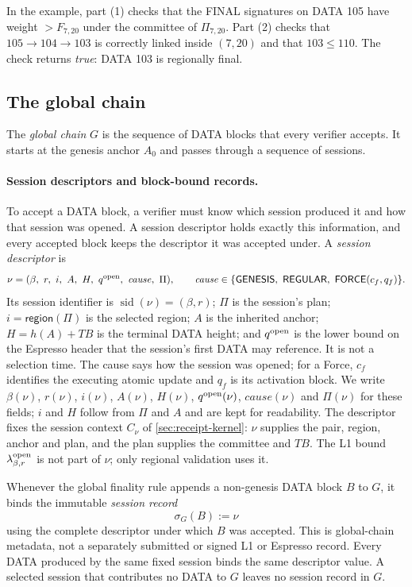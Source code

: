 \documentclass[11pt,a4paper]{article}
\newcommand{\TB}{\mathit{TB}}
\newcommand{\tagg}[1]{\ensuremath{\mathsf{#1}}}
\newcommand{\defterm}[1]{\textcolor{rrBlue}{\textit{#1}}}
\begin{document}
In the example, part (1) checks that the FINAL signatures on DATA 105
have weight $>F_{7,20}$ under the committee of $\Pi_{7,20}$. Part (2) checks that
$105\to104\to103$ is correctly linked inside $(7,20)$ and that
$103\le110$. The check returns \emph{true}: DATA 103 is regionally final.



\subsection{The global chain}
\label{sec:global-finality}
\label{sec:global-chain}
The \defterm{global chain} $G$ is the sequence of DATA blocks that every
verifier accepts. It starts at the genesis anchor $A_0$ and passes
through a sequence of sessions.

\paragraph{Session descriptors and block-bound records.}
To accept a DATA block, a verifier must know which session produced it
and how that session was opened. A session descriptor holds exactly this
information, and every accepted block keeps the descriptor it was
accepted under. A \defterm{session descriptor} is
\[
 \nu=(\beta,\ r,\ i,\ A,\ H,\ q^{\rm open},\ \mathit{cause},\ \Pi),\qquad
 \mathit{cause}\in\{\tagg{GENESIS},\ \tagg{REGULAR},\
 \tagg{FORCE}(c_f,q_f)\}.
\]
Its session identifier is $\operatorname{sid}(\nu)=(\beta,r)$; $\Pi$ is
the session's plan; $i=\tagg{region}(\Pi)$ is the selected region; $A$ is
the inherited anchor; $H=h(A)+\TB$ is the terminal DATA height; and
$q^{\rm open}$ is the lower bound on the Espresso header that the
session's first DATA may reference. It is not a selection time. The
cause says how the session was opened; for a Force, $c_f$ identifies the
executing atomic update and $q_f$ is its activation block.  We write
$\beta(\nu)$, $r(\nu)$, $i(\nu)$, $A(\nu)$, $H(\nu)$, $q^{\rm open}(\nu)$,
$\mathit{cause}(\nu)$ and $\Pi(\nu)$ for these fields; $i$ and $H$ follow
from $\Pi$ and $A$ and are kept for readability.  The descriptor
fixes the session context $C_\nu$ of \cref{sec:receipt-kernel}: $\nu$
supplies the pair, region, anchor and plan, and the plan supplies the
committee and $\TB$.  The L1 bound $\lambda^{\rm open}_{\beta,r}$ is not
part of $\nu$; only regional validation uses it.

Whenever the global finality rule appends a non-genesis DATA block
$B$ to $G$, it binds the immutable \defterm{session record}
\[
 \sigma_G(B):=\nu
\]
using the complete descriptor under which $B$ was accepted. This is
global-chain metadata, not a separately submitted or signed L1 or
Espresso record.  Every DATA produced by the same fixed session binds
the same descriptor value.  A selected session that contributes no DATA
to $G$ leaves no session record in $G$.
\end{document}
